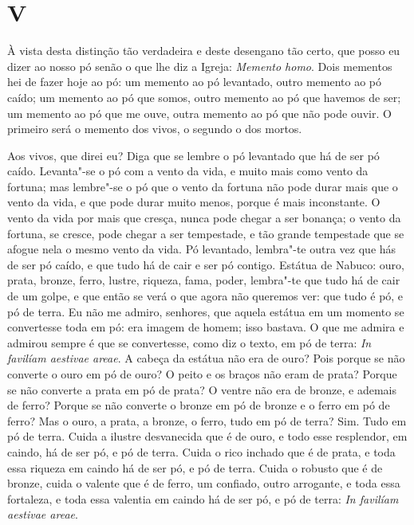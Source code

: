 \section*{V}

À vista desta distinção tão verdadeira e deste desengano tão certo, que
posso eu dizer ao nosso pó senão o que lhe diz a Igreja: \emph{Memento
homo}. Dois mementos hei de fazer hoje ao pó: um memento ao pó
levantado, outro memento ao pó caído; um memento ao pó que somos, outro
memento ao pó que havemos de ser; um memento ao pó que me ouve, outra
memento ao pó que não pode ouvir. O primeiro será o memento dos vivos, o
segundo o dos mortos.

Aos vivos, que direi eu? Diga que se lembre o pó levantado que há de ser
pó caído. Levanta"-se o pó com a vento da vida, e muito
mais como vento da fortuna; mas lembre"-se o pó que o vento da fortuna
não pode durar mais que o vento da vida, e que pode durar muito menos,
porque é mais inconstante. O vento da vida por mais que cresça, nunca
pode chegar a ser bonança; o vento da fortuna, se
cresce, pode chegar a ser tempestade, e tão grande tempestade que se
afogue nela o mesmo vento da vida. Pó levantado, lembra"-te outra vez que
hás de ser pó caído, e que tudo há de cair e ser pó contigo. Estátua de
Nabuco: ouro, prata, bronze, ferro, lustre, riqueza, fama, poder,
lembra"-te que tudo há de cair de um golpe, e que então se verá o que
agora não queremos ver: que tudo é pó, e pó de terra. Eu não me admiro,
senhores, que aquela estátua em um momento se convertesse toda em pó:
era imagem de homem; isso bastava. O que me admira e admirou sempre é
que se convertesse, como diz o texto, em pó de terra: \emph{In favilíam
aestivae areae}. A cabeça da estátua não era de ouro? Pois %
porque se não converte o ouro em pó de ouro? O peito e os braços não
eram de prata? Porque se não converte a prata em pó de prata? O ventre
não era de bronze, e ademais de ferro? Porque se não converte o bronze
em pó de bronze e o ferro em pó de ferro? Mas o ouro, a prata, a bronze,
o ferro, tudo em pó de terra? Sim. Tudo em pó de terra. Cuida a ilustre
desvanecida que é de ouro, e todo esse resplendor, em caindo, há de ser
pó, e pó de terra. Cuida o rico inchado que é de prata, e toda essa
riqueza em caindo há de ser pó, e pó de terra. Cuida o robusto que é de
bronze, cuida o valente que é de ferro, um confiado, outro arrogante, e
toda essa fortaleza, e toda essa valentia em caindo há de ser pó, e pó
de terra: \emph{In favilíam aestivae areae}.

